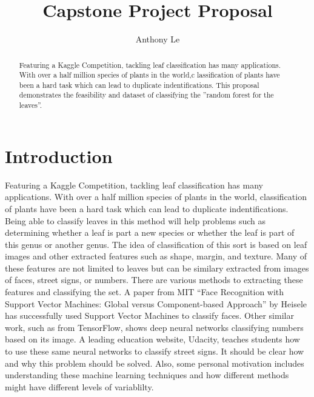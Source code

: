 \documentclass{article}
\begin{document}
\title{Capstone Project Proposal}
\author{Anthony Le}

\maketitle

\begin{abstract}
Featuring a Kaggle Competition, tackling leaf classification has many applications. With over a half million species of plants in the world,c lassification of plants have been a hard task which can lead to duplicate indentifications. This proposal demonstrates the feasibility and dataset of classifying the ''random forest for the leaves''.
\end{abstract}

\section{Introduction}
	Featuring a Kaggle Competition, tackling leaf classification has many applications. With over a half million species of plants in the world, classification of plants have been a hard task which can lead to duplicate indentifications. Being able to classify leaves in this method will help problems such as determining whether a leaf is part a new species or whether the leaf is part of this genus or another genus. The idea of classification of this sort is based on leaf images and other extracted features such as shape, margin, and texture. Many of these features are not limited to leaves but can be similary extracted from images of faces, street signs, or numbers. There are various methods to extracting these features and classifying the set. A paper from MIT ``Face Recognition with Support Vector Machines: Global versus Component-based Approach'' by Heisele has successfully used Support Vector Machines to classify faces. Other similar work, such as from TensorFlow, shows deep neural networks classifying numbers based on its image. A leading education website, Udacity, teaches students how to use these same neural networks to classify street signs.
\newline
\newline
	It should be clear how and why this problem should be solved. Also, some personal motivation includes understanding these machine learning techniques and how different methods might have different levels of variablilty. 
	
\end{document}
